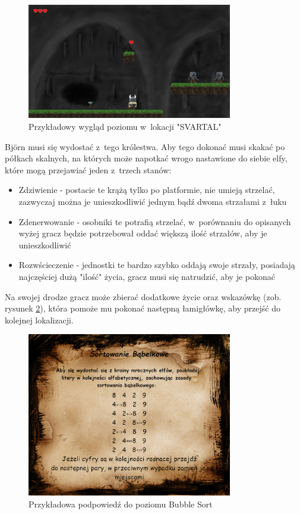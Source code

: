 \documentclass[12pt,a4paper,oneside]{book}
\theoremstyle{definition}
\numberwithin{equation}{chapter}
\begin{document}
\begin{figure}[hpt!]
        \centering
        \includegraphics[width=0.8\textwidth]{poziomy/svartal.png}
        \caption{Przykładowy wygląd poziomu w~lokacji "SVARTAL"}
        \label{SvartalPlatform}
    \end{figure}
\newpage
\par Björn musi się wydostać z~tego królestwa. Aby tego dokonać musi skakać po półkach skalnych, na których może napotkać wrogo nastawione do siebie elfy, które mogą przejawiać jeden z~trzech stanów:
\begin{itemize}
    \item Zdziwienie - postacie te krążą tylko po platformie, nie umieją strzelać, zazwyczaj można je unieszkodliwić jednym bądź dwoma strzałami z~łuku
    \item Zdenerwowanie - osobniki te potrafią strzelać, w~porównaniu do opisanych wyżej gracz będzie potrzebował oddać większą ilość strzałów, aby je unieszkodliwić
    \item Rozwścieczenie - jednostki te bardzo szybko oddają swoje strzały, posiadają najczęściej dużą "ilość" życia, gracz musi się natrudzić, aby je pokonać
\end{itemize}

\par Na swojej drodze gracz może zbierać dodatkowe życie oraz wskazówkę (zob. rysunek \ref{BubbleSortHelper}), która pomoże mu pokonać następną łamigłówkę, aby przejść do kolejnej lokalizacji. 

\begin{figure}[hpt!]
        \centering
        \includegraphics[width=0.8\textwidth]{podpowiedzi/helper_bubble_sort.png}
        \caption{Przykładowa podpowiedź do poziomu Bubble Sort}
        \label{BubbleSortHelper}
    \end{figure}
\end{document}
